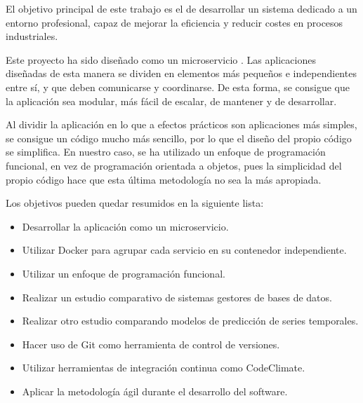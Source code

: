 
El objetivo principal de este trabajo es el de desarrollar un sistema dedicado a un entorno profesional, capaz 
de mejorar la eficiencia y reducir costes en procesos industriales.

Este proyecto ha sido diseñado como un microservicio \cite{amazon:microservicios}. Las aplicaciones diseñadas de esta manera se dividen 
en elementos más pequeños e independientes entre sí, y que deben comunicarse y coordinarse. De esta 
forma, se consigue que la aplicación sea modular, más fácil de escalar, de mantener y de desarrollar.

Al dividir la aplicación en lo que a efectos prácticos son aplicaciones más simples, se consigue un código 
mucho más sencillo, por lo que el diseño del propio código se simplifica. En nuestro caso, se ha utilizado 
un enfoque de programación funcional, en vez de programación orientada a objetos, pues la simplicidad del propio 
código hace que esta última metodología no sea la más apropiada.

Los objetivos pueden quedar resumidos en la siguiente lista:
\begin{itemize}
    \item Desarrollar la aplicación como un microservicio.
    \item Utilizar Docker para agrupar cada servicio en su contenedor independiente.
    \item Utilizar un enfoque de programación funcional.
    \item Realizar un estudio comparativo de sistemas gestores de bases de datos.
    \item Realizar otro estudio comparando modelos de predicción de series temporales.
    \item Hacer uso de Git como herramienta de control de versiones.
    \item Utilizar herramientas de integración continua como CodeClimate.
    \item Aplicar la metodología ágil durante el desarrollo del software.
\end{itemize}